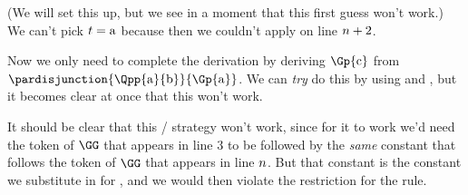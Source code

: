 (We will set this up, but we see in a moment that this first guess won't work.)
We can't pick $t=\mathrm{a}$ because then we couldn't apply  on line $n+2$.
\begin{gproof}[\label{GQDExampleJ}]
\end{gproof}
Now we only need to complete the derivation by deriving $\Gp{\constant{c}}$ from $\pardisjunction{\Qpp{\constant{a}}{\constant{b}}}{\Gp{\constant{a}}}$. 
We can \emph{try} do this by using  and , but it becomes clear at once that this won't work.
\begin{gproof}[\label{GQDExampleK}]
\end{gproof}
It should be clear that this / strategy won't work, since for it to work we'd need the token of $\GG$ that appears in line 3 to be followed by the \emph{same} constant that follows the token of $\GG$ that appears in line $n$. 
But that constant is the constant we substitute in for , and we would then violate the restriction for the rule. 

